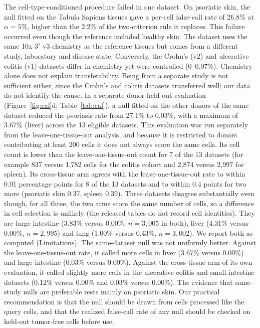 \documentclass[11pt,letterpaper]{article}
\begin{document}
The cell-type-conditioned procedure failed in one dataset. On psoriatic skin, the null fitted on the Tabula Sapiens tissues gave a per-cell false-call rate of 26.8\% at $\alpha = 5\%$, higher than the 2.2\% of the two-criterion rule it replaces. This failure occurred even though the reference included healthy skin. The dataset uses the same 10x 3$'$ v3 chemistry as the reference tissues but comes from a different study, laboratory and disease state. Conversely, the Crohn's (v2) and ulcerative colitis (v1) datasets differ in chemistry yet were controlled (0--0.07\%). Chemistry alone does not explain transferability. Being from a separate study is not sufficient either, since the Crohn's and colitis datasets transferred well; our data do not identify the cause. In a separate donor-held-out evaluation (Figure~\ref{fig:cal}d; Table~\ref{tab:cal}), a null fitted on the other donors of the same dataset reduced the psoriasis rate from 27.1\% to 0.03\%, with a maximum of 3.67\% (liver) across the 13 eligible datasets. This evaluation was run separately from the leave-one-tissue-out analysis, and because it is restricted to donors contributing at least 200 cells it does not always score the same cells. Its cell count is lower than the leave-one-tissue-out count for 7 of the 13 datasets (for example 837 versus 1{,}782 cells for the colitis cohort and 2{,}874 versus 2{,}997 for spleen). Its cross-tissue arm agrees with the leave-one-tissue-out rate to within 0.01 percentage points for 8 of the 13 datasets and to within 0.4 points for two more (psoriatic skin 0.37, spleen 0.39). Three datasets disagree substantially even though, for all three, the two arms score the same number of cells, so a difference in cell selection is unlikely (the released tables do not record cell identities). They are large intestine (3.83\% versus 0.00\%, $n = 3{,}005$ in both), liver (4.31\% versus 0.00\%, $n = 2{,}995$) and lung (1.00\% versus 0.43\%, $n = 3{,}002$). We report both as computed (Limitations). The same-dataset null was not uniformly better. Against the leave-one-tissue-out rate, it called more cells in liver (3.67\% versus 0.00\%) and large intestine (0.03\% versus 0.00\%). Against the cross-tissue arm of its own evaluation, it called slightly more cells in the ulcerative colitis and small-intestine datasets (0.12\% versus 0.00\% and 0.03\% versus 0.00\%). The evidence that same-study nulls are preferable rests mainly on psoriatic skin. Our practical recommendation is that the null should be drawn from cells processed like the query cells, and that the realized false-call rate of any null should be checked on held-out tumor-free cells before use.
\end{document}
